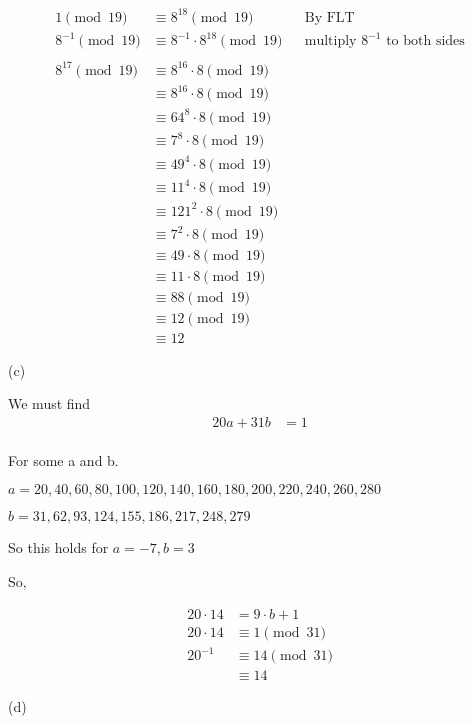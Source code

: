\begin{solution}
\begin{align*}
1 \pmod{19} &\equiv 8^{18} \pmod{19}&& \text{By FLT}\\
8^{-1} \pmod{19} &\equiv 8^{-1} \cdot 8^{18} \pmod{19} && \text{multiply $8^{-1}$ to both sides}\\
\\
8^{17} \pmod{19} &\equiv 8^{16} \cdot 8 \pmod{19} \\
&\equiv 8^{16} \cdot 8 \pmod{19} \\
&\equiv 64^{8} \cdot 8 \pmod{19} \\
&\equiv 7^{8} \cdot 8 \pmod{19} \\
&\equiv 49^{4} \cdot 8 \pmod{19} \\
&\equiv 11^{4} \cdot 8 \pmod{19} \\
&\equiv 121^{2} \cdot 8 \pmod{19} \\
&\equiv 7^{2} \cdot 8 \pmod{19} \\
&\equiv 49 \cdot 8 \pmod{19} \\
&\equiv 11 \cdot 8 \pmod{19} \\
&\equiv 88 \pmod{19} \\
&\equiv 12 \pmod{19} \\
&\equiv 12 
\end{align*}

(c)

We must find
\begin{align*}
20a + 31b &= 1\\
\end{align*}

For some a and b.

$a = {20, 40, 60, 80, 100, 120, 140, 160, 180, 200, 220, 240, 260, 280}$

$b = {31, 62, 93, 124, 155, 186, 217, 248, 279}$

So this holds for $a=-7, b=3$

So, 

\begin{align*}
20 \cdot 14 &= 9 \cdot b + 1 \\
20 \cdot 14 &\equiv 1 \pmod{31} \\
20^{-1} &\equiv 14 \pmod{31} \\
&\equiv 14 
\end{align*}

\pagebreak
(d)


\end{solution}

